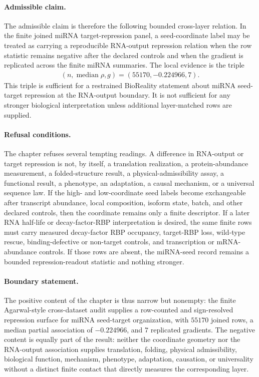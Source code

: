 \paragraph{Admissible claim.}
The admissible claim is therefore the following bounded cross-layer relation.  In the finite joined miRNA target-repression panel, a seed-coordinate label may be treated as carrying a reproducible RNA-output repression relation when the row statistic remains negative after the declared controls and when the gradient is replicated across the finite miRNA summaries.  The local evidence is the triple
$$
\begin{aligned}
  (n,\operatorname{median}\rho,g)=(55170,-0.224966,7).
\end{aligned}
$$
This triple is sufficient for a restrained BioReality statement about miRNA seed-target repression at the RNA-output boundary.  It is not sufficient for any stronger biological interpretation unless additional layer-matched rows are supplied.

\paragraph{Refusal conditions.}
The chapter refuses several tempting readings.  A difference in RNA-output or target repression is not, by itself, a translation realization, a protein-abundance measurement, a folded-structure result, a physical-admissibility assay, a functional result, a phenotype, an adaptation, a causal mechanism, or a universal sequence law.  If the high- and low-coordinate seed labels become exchangeable after transcript abundance, local composition, isoform state, batch, and other declared controls, then the coordinate remains only a finite descriptor.  If a later RNA half-life or decay-factor-RBP interpretation is desired, the same finite rows must carry measured decay-factor RBP occupancy, target-RBP loss, wild-type rescue, binding-defective or non-target controls, and transcription or mRNA-abundance controls.  If those rows are absent, the miRNA-seed record remains a bounded repression-readout statistic and nothing stronger.

\paragraph{Boundary statement.}
The positive content of the chapter is thus narrow but nonempty: the finite Agarwal-style cross-dataset audit supplies a row-counted and sign-resolved repression surface for miRNA seed-target organization, with $55170$ joined rows, a median partial association of $-0.224966$, and $7$ replicated gradients.  The negative content is equally part of the result: neither the coordinate geometry nor the RNA-output association supplies translation, folding, physical admissibility, biological function, mechanism, phenotype, adaptation, causation, or universality without a distinct finite contact that directly measures the corresponding layer.
